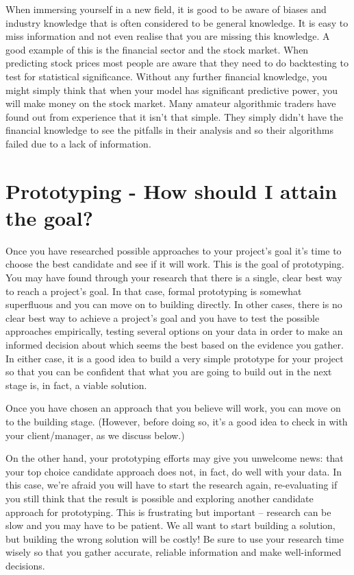 \documentclass[
]{book}
\begin{document}
When immersing yourself in a new field, it is good to be aware of biases and industry knowledge that is often considered to be general knowledge. It is easy to miss information and not even realise that you are missing this knowledge. A good example of this is the financial sector and the stock market. When predicting stock prices most people are aware that they need to do backtesting to test for statistical significance. Without any further financial knowledge, you might simply think that when your model has significant predictive power, you will make money on the stock market. Many amateur algorithmic traders have found out from experience that it isn't that simple. They simply didn't have the financial knowledge to see the pitfalls in their analysis and so their algorithms failed due to a lack of information.

\hypertarget{prototyping---how-should-i-attain-the-goal}{%
\section{Prototyping - How should I attain the goal?}\label{prototyping---how-should-i-attain-the-goal}}

Once you have researched possible approaches to your project's goal it's time to choose the best candidate and see if it will work. This is the goal of prototyping. You may have found through your research that there is a single, clear best way to reach a project's goal. In that case, formal prototyping is somewhat superfluous and you can move on to building directly. In other cases, there is no clear best way to achieve a project's goal and you have to test the possible approaches empirically, testing several options on your data in order to make an informed decision about which seems the best based on the evidence you gather. In either case, it is a good idea to build a very simple prototype for your project so that you can be confident that what you are going to build out in the next stage is, in fact, a viable solution.

Once you have chosen an approach that you believe will work, you can move on to the building stage. (However, before doing so, it's a good idea to check in with your client/manager, as we discuss below.)

On the other hand, your prototyping efforts may give you unwelcome news: that your top choice candidate approach does not, in fact, do well with your data. In this case, we're afraid you will have to start the research again, re-evaluating if you still think that the result is possible and exploring another candidate approach for prototyping. This is frustrating but important -- research can be slow and you may have to be patient. We all want to start building a solution, but building the wrong solution will be costly! Be sure to use your research time wisely so that you gather accurate, reliable information and make well-informed decisions.
\end{document}
